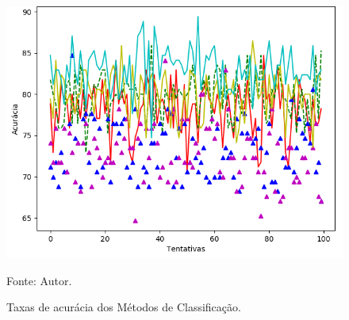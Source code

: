 \documentclass[
	12pt,				%
	openright,			%
	oneside,			%
	a4paper,			%
	english,			%
	french,				%
	spanish,			%
	brazil,				%
	]{abntex2}
\begin{document}
\begin{figure}[ht]
    \centering
    \caption{Taxas de acurácia dos Métodos de Classificação.}
    \includegraphics[width=5.0in]{Images/acc-classification.png}
    \label{fig: grafico-acc}
    
    \centering \small Fonte: Autor.
\end{figure}
\end{document}
